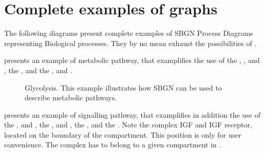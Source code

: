 \chapter{Complete examples of \SBGNPDLone graphs}

The following diagrams present complete examples of SBGN Process Diagrams representing Biological processes. They by no mean exhaust the possibilities of  \SBGNPDLone.

 presents an example of metabolic pathway, that examplifies the use of the  , , and , the  , and the  ,  and .

\begin{figure}[htb]
\begin{center}
\caption{Glycolysis. This example illustrates how SBGN can be used to describe metabolic pathways.}\label{fig:glycolysis}
\end{center}
\end{figure}

 presents an example of signalling pathway, that examplifies in addition the use of the  , and , the  ,  and , the  , and the  . Note the complex IGF and IGF receptor, located on the boundary of the compartment. This position is only for user convenience. The complex has to belong to a given compartment in \SBGNPDLone.

